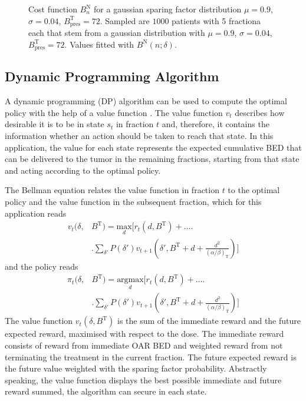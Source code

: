 \documentclass[\relativeRoot/ada.tex]{subfiles}
\begin{document}
\begin{figure}[!htb]
    
\caption{Cost function $B^{\text{N}}_n$ for a gaussian sparing factor distribution $\mu=0.9$, $\sigma=0.04$, $B_{\text{pres}}^{\text{T}}=72$. Sampled are $1000$ patients with 5 fractiona each that stem from a gaussian distribution with $\mu=0.9$, $\sigma=0.04$, $B_{\text{pres}}^{\text{T}}=72$. Values fitted with $B^{\text{N}}(n; \delta)$.}
\label{fig:cost_function}
\end{figure}


\subsection{Dynamic Programming Algorithm}
\label{sec:DP}
A dynamic programming (DP) algorithm can be used to compute the optimal policy with the help of a value function \cite{sutton_reinforcement}. The value function $v_t$ describes how desirable it is to be in state $s_t$ in fraction $t$ and, therefore, it contains the information whether an action should be taken to reach that state. In this application, the value for each state represents the expected cumulative BED that can be delivered to the tumor in the remaining fractions, starting from that state and acting according to the optimal policy.

The Bellman equation relates the value function in fraction $t$ to the optimal policy and the value function in the subsequent fraction, which for this application reads
\begin{equation}\label{eq:value_function}
    \begin{split}
    v_t(\delta, & B^{\text{T}}) = \underset{d}{\text{max}} \Biggr[
    r_t(d, B^{\text{T}}) + \ldots \Biggr.\\
    & \Biggr. \sum_{\delta'}P(\delta')v_{t+1} \left( \delta', B^{\text{T}} + d + \frac{d^2}{(\alpha / \beta)_\text{T}} \right) \Biggr]
    \end{split}
\end{equation}
and the policy reads
\begin{equation}\label{eq:policy_function}
    \begin{split}
    \pi_t(\delta, & B^{\text{T}}) = \underset{d}{\text{argmax}} \Biggr[
    r_t(d, B^{\text{T}}) + \ldots \Biggr.\\
    & \Biggr. \sum_{\delta'}P(\delta')v_{t+1} \left( \delta', B^{\text{T}} + d + \frac{d^2}{(\alpha / \beta)_\text{T}} \right) \Biggr]
    \end{split}
\end{equation}
The value function $v_t(\delta, B^{\text{T}})$ is the sum of the immediate reward and the future expected reward, maximised with respect to the dose. The immediate reward consists of reward from immediate OAR BED and weighted reward from not terminating the treatment in the current fraction. The future expected reward is the future value weighted with the sparing factor probability. Abstractly speaking, the value function displays the best possible immediate and future reward summed, the algorithm can secure in each state.
\end{document}
